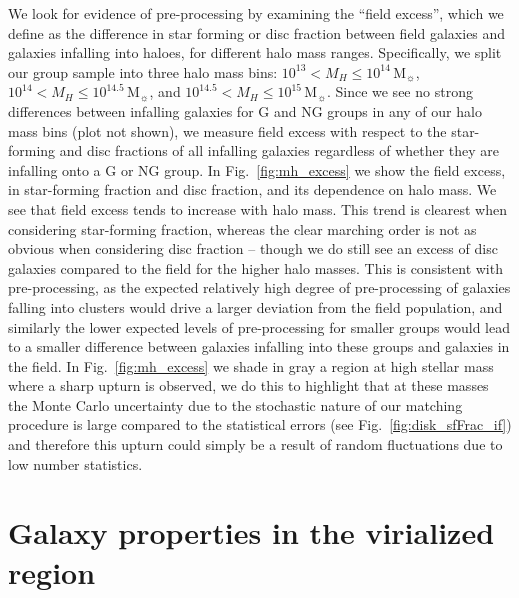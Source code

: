 \documentclass[a4paper,fleqn,usenatbib]{mnras}
\newcommand{\Msun}{\,\mathrm{M_{\sun}}}
\begin{document}
We look for evidence of pre-processing by examining the ``field
excess'', which we define as the difference in star forming or disc
fraction between field galaxies and galaxies infalling into haloes,
for different halo mass ranges.  Specifically, we split our group
sample into three halo mass bins: $10^{13} < M_H \le 10^{14}\Msun$,
  $10^{14} < M_H \le 10^{14.5}\Msun$, and $10^{14.5} < M_H \le
  10^{15}\Msun$.  Since we see no strong
differences between infalling galaxies for G and NG groups in any of
our halo mass bins (plot not shown), we measure field excess with respect to the star-forming and
disc fractions of all infalling galaxies regardless of whether they
are infalling onto a G or NG group.  In Fig.~\ref{fig:mh_excess}  we show
the field excess, in star-forming fraction and disc
fraction, and its dependence on halo mass.  We see that field excess
tends to increase with halo mass.  This trend is clearest when
considering star-forming fraction, whereas the clear marching order is
not as obvious when considering disc fraction -- though we do still
see an excess of disc galaxies compared to the field for the higher
halo masses.  This is consistent with pre-processing, as
the expected relatively high degree of pre-processing of galaxies falling into
clusters would drive a larger deviation from the field population, and
similarly the lower expected levels of pre-processing for smaller
groups would lead to a smaller difference between galaxies infalling into
these groups and galaxies in the field.  In Fig.~\ref{fig:mh_excess}
we shade in gray a region at high stellar mass where a sharp upturn is
observed, we do this to highlight that at these masses the Monte Carlo
uncertainty due to the stochastic nature of our matching procedure is
large compared to the statistical errors (see
Fig.~\ref{fig:disk_sfFrac_if}) and therefore this upturn could simply
be a result of random fluctuations due to
low number statistics.


\section{Galaxy properties in the virialized region}
\label{sec:virial}
\end{document}
